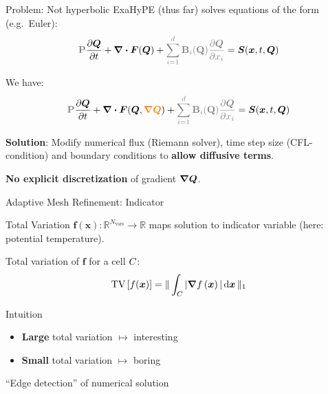 \documentclass[aspectratio=169]{beamer}
\begin{document}
\begin{frame}{Problem: Not hyperbolic}
  ExaHyPE (thus far) solves equations of the form (e.g.\ Euler):
  \begin{equation}
  \label{eq:conservation-law}
  \mathbf{\textcolor{gray}{P}}\pdv{\Q}{t} + \divergence{\flux(\Q)}
 +  \textcolor{gray}{\sum_{i=1}^d \mathbf{B}_i (\mathbf{Q}) \pdv{\Q}{x_i}}
  = \source(\bm{x}, t, \Q)
\end{equation}

We have:
\begin{equation}
  \label{eq:conservation-law-gradient}
  \mathbf{\textcolor{gray}{P}}\pdv{\Q}{t} + \divergence{\flux(\Q, \textcolor{orange}{\gradQ})}
 +  \textcolor{gray}{\sum_{i=1}^d \mathbf{B}_i (\mathbf{Q}) \pdv{\Q}{x_i}}
  = \source(\bm{x}, t, \Q)
\end{equation}

\textbf{Solution}:
Modify numerical flux (Riemann solver), time step size (CFL-condition) and boundary conditions to \textbf{allow diffusive terms}.

\textbf{No explicit discretization} of gradient \textcolor{orange}{$\gradQ$}.
\end{frame}

\begin{frame}{Adaptive Mesh Refinement: Indicator}
  \begin{block}{Total Variation}
  $\bm{f}(\bm{x}): \mathbb{R}^{N_\text{vars}} \to \mathbb{R}$ maps solution to indicator variable (here: potential temperature).

  Total variation of $\bm{f}$ for a cell $C_{}$:
\begin{equation}
  \label{eq:tv}
  \tv \left[ f(\bm{x}) \right] =
  \Vert
\intdcell{ \vert \gradient{f \left( \bm{x} \right)} \vert }
\Vert_1
\end{equation}
    
  \end{block}

\begin{block}{Intuition}
  \begin{itemize}
\item \textbf{Large} total variation $\mapsto$ interesting
\item \textbf{Small} total variation $\mapsto$ boring
  \end{itemize}
  \enquote{Edge detection} of numerical solution
\end{block}

\end{frame}  
\end{document}

